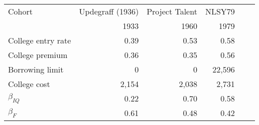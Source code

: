 \begin{tabular}{lrrrrr}
\hline
Cohort & Updegraff (1936)  & Project Talent  & NLSY79  &   &   \\ 
  & 1933  & 1960  & 1979  &   &   \\ 
\hline
College entry rate & 0.39  & 0.53  & 0.58  &   &   \\ 
College premium & 0.36  & 0.35  & 0.56  &   &   \\ 
Borrowing limit & 0  & 0  & 22,596  &   &   \\ 
College cost & 2,154  & 2,038  & 2,731  &   &   \\ 
\hline
$\beta_{IQ}$ & 0.22  & 0.70  & 0.58  &   &   \\ 
$\beta_{F}$ & 0.61  & 0.48  & 0.42  &   &   \\ 
\hline
\end{tabular}%
